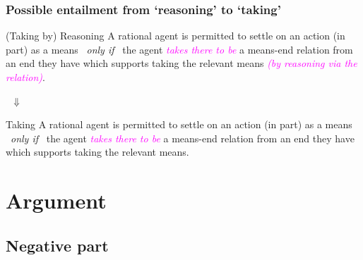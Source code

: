 \documentclass[noamssymb,
]{beamer} %
\begin{document}
\begin{frame}
  \frametitle{Possible entailment from `reasoning' to `taking'}

  \begin{block}{(Taking by) Reasoning}
   A rational agent is permitted to settle on an action (in part) as a means
    \newline
    \mbox{ }\hfill\emph{only if}\hfill\mbox{ }
    \newline
    the agent \textcolor{fuchsia}{\emph{takes there to be}}  a means-end relation from an end they have which supports taking the relevant means \textcolor{fuchsia}{\emph{(by reasoning via the relation)}}.
  \end{block}

  {\Large \mbox{ }\hfill\(\Downarrow\)\hfill\mbox{ }}

  \begin{block}{Taking}
    A rational agent is permitted to settle on an action (in part) as a means
    \newline
    \mbox{ }\hfill\emph{only if}\hfill\mbox{ }
    \newline
    the agent \textcolor{fuchsia}{\emph{takes there to be}} a means-end relation from an end they have which supports taking the relevant means.
  \end{block}

\end{frame}


\section{Argument}
\label{sec:argument}


\subsection{Negative part}
\label{sec:negative}
\end{document}
